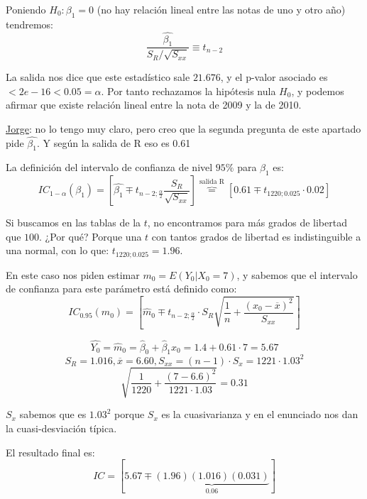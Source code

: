 \begin{problem}[1]
\solution
{}


\spart
Poniendo $H_0: β_1=0$ (no hay relación lineal entre las notas de uno y otro año) tendremos:
\[\frac{\hat{β_1}}{S_R / \sqrt{S_{xx}}} \equiv t_{n-2}\]

La salida nos dice que este estadístico sale $21.676$, y el p-valor asociado es $<2e-16<0.05=α$. Por tanto rechazamos la hipótesis nula $H_0$, y podemos afirmar que existe relación lineal entre la nota de 2009 y la de 2010.

{\color{gray} \underline{Jorge}: no lo tengo muy claro, pero creo que la segunda pregunta de este apartado pide $\hat{β_1}$. Y según la salida de R eso es 0.61}

\spart
La definición del intervalo de confianza de nivel $95\%$ para $β_1$ es:
\[IC_{1-α}(β_1) = \left[ \hat{β_1} \mp t_{n-2;\frac{α}{2}} \frac{S_R}{\sqrt{S_{xx}}} \right] \overbrace{=}^{\text{salida R}} \left[ 0.61 \mp t_{1220;0.025} · 0.02 \right]\]

Si buscamos en las tablas de la $t$, no encontramos para más grados de libertad que $100$. ¿Por qué? Porque una $t$ con tantos grados de libertad es indistinguible a una normal, con lo que: $t_{1220;0.025} = 1.96$.

\spart
En este caso nos piden estimar $m_0 = E(Y_0|X_0=7)$, y sabemos que el intervalo de confianza para este parámetro
está definido como:
\[IC_{0.95}(m_0) = \left[ \hat{m}_0 \mp t_{n-2;\frac{α}{2}} · S_R\sqrt{\frac{1}{n} + \frac{(x_0 - \overline{x})^2}{S_{xx}}} \right]\]

\[\hat{Y_0} = \hat{m}_0 = \hat{β}_0 + \hat{β}_1x_0 = 1.4 + 0.61·7 = 5.67\]
\[S_R = 1.016, \overline{x}=6.60, S_{xx} = (n-1)·S_x= 1221·1.03^2 \]
\[ \sqrt{\frac{1}{1220}+\frac{(7-6.6)^2}{1221·1.03}} = 0.31 \]

$S_{x}$ sabemos que es $1.03^2$ porque $S_{x}$ es la cuasivarianza y en el enunciado nos dan la cuasi-desviación típica.


El resultado final es:
\[
IC = [5.67 \mp \underbrace{(1.96)(1.016)(0.031)}_{0.06}]
\]

\end{problem}



